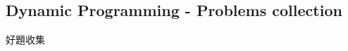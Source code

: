 \documentclass[10pt,oneside]{article}
\begin{document}
\begin{landscape}
\begin{multicols}{2}



\section{Dynamic Programming - Problems collection}

好題收集

\end{multicols}
\end{landscape}
\end{document}
